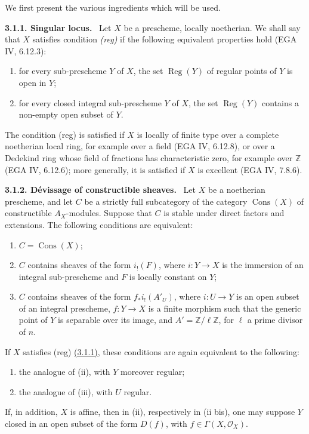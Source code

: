 \documentclass[11pt]{article}
\DeclareMathOperator{\Reg}{Reg}
\providecommand{\cO}{\mathcal{O}}
\providecommand{\ZZ}{\mathbb{Z}}
\newenvironment{statement}[1]{\par\medskip\noindent\textbf{#1.}\ }{\par\medskip}
\begin{document}
We first present the various ingredients which will be used.

\label{sga5:I:statement:3.1.1}\begin{statement}{3.1.1. Singular locus}
Let $X$ be a prescheme, locally noetherian. We shall say that $X$ satisfies condition \emph{(reg)} if the following equivalent properties hold (EGA IV, 6.12.3):
\begin{enumerate}[label=(\roman*)]
\item for every sub-prescheme $Y$ of $X$, the set $\Reg(Y)$ of regular points of $Y$ is open in $Y$;
\item for every closed integral sub-prescheme $Y$ of $X$, the set $\Reg(Y)$ contains a non-empty open subset of $Y$.
\end{enumerate}
The condition (reg) is satisfied if $X$ is locally of finite type over a complete noetherian local ring, for example over a field (EGA IV, 6.12.8), or over a Dedekind ring whose field of fractions has characteristic zero, for example over $\ZZ$ (EGA IV, 6.12.6); more generally, it is satisfied if $X$ is excellent (EGA IV, 7.8.6).
\end{statement}

\label{sga5:I:statement:3.1.2}\begin{statement}{3.1.2. Dévissage of constructible sheaves}
Let $X$ be a noetherian prescheme, and let $C$ be a strictly full subcategory of the category $\operatorname{Cons}(X)$ of constructible $A_X$-modules. Suppose that $C$ is stable under direct factors and extensions. The following conditions are equivalent:
\begin{enumerate}[label=(\roman*)]
\item $C=\operatorname{Cons}(X)$;
\item $C$ contains sheaves of the form $i_!(F)$, where $i:Y\to X$ is the immersion of an integral sub-prescheme and $F$ is locally constant on $Y$;
\item $C$ contains sheaves of the form $f_*i_!(A'_U)$, where $i:U\to Y$ is an open subset of an integral prescheme, $f:Y\to X$ is a finite morphism such that the generic point of $Y$ is separable over its image, and $A'=\ZZ/\ell\ZZ$, for $\ell$ a prime divisor of $n$.
\end{enumerate}
If $X$ satisfies (reg) \hyperref[sga5:I:statement:3.1.1]{(3.1.1)}, these conditions are again equivalent to the following:
\begin{enumerate}[label=(\roman* bis)]
\item the analogue of (ii), with $Y$ moreover regular;
\item the analogue of (iii), with $U$ regular.
\end{enumerate}
If, in addition, $X$ is affine, then in (ii), respectively in (ii bis), one may suppose $Y$ closed in an open subset of the form $D(f)$, with $f\in \Gamma(X,\cO_X)$.
\end{statement}
\end{document}

